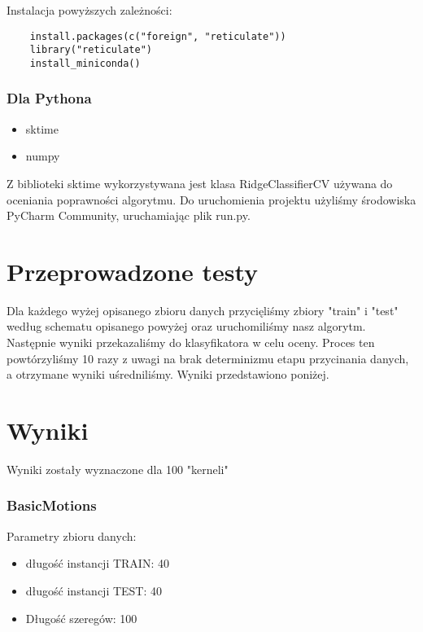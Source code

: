\documentclass[12pt]{article}
\begin{document}
Instalacja powyższych zależności:
\begin{verbatim}
    install.packages(c("foreign", "reticulate"))
    library("reticulate")
    install_miniconda()
\end{verbatim}

\subsubsection*{Dla Pythona}
\begin{itemize}
  \item sktime
  \item numpy
\end{itemize}

Z biblioteki sktime wykorzystywana jest klasa RidgeClassifierCV używana do oceniania poprawności algorytmu. Do uruchomienia projektu użyliśmy środowiska PyCharm Community, uruchamiając plik run.py.

\section{Przeprowadzone testy}

Dla każdego wyżej opisanego zbioru danych przycięliśmy zbiory "train" i "test" według schematu opisanego powyżej oraz uruchomiliśmy nasz algorytm. Następnie wyniki przekazaliśmy do klasyfikatora w celu oceny. Proces ten powtórzyliśmy 10 razy z uwagi na brak determinizmu etapu przycinania danych, a otrzymane wyniki uśredniliśmy. Wyniki przedstawiono poniżej.

\section{Wyniki}
Wyniki zostały wyznaczone dla 100 "kerneli"

\subsubsection*{BasicMotions}
Parametry zbioru danych:
\begin{itemize}
  \item długość instancji TRAIN: 40
  \item długość instancji TEST: 40
  \item Długość szeregów: 100
\end{itemize}
\end{document}
